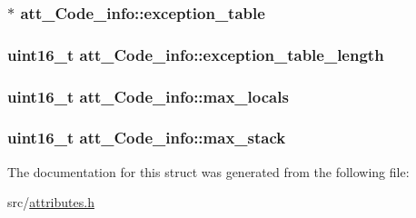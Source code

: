 \subsubsection[{\texorpdfstring{exception\+\_\+table}{exception_table}}]{$\ast$ att\+\_\+\+Code\+\_\+info\+::exception\+\_\+table}\hypertarget{structatt__Code__info_af5c5d84bb1f725dc949981cc752c45d2}{}\label{structatt__Code__info_af5c5d84bb1f725dc949981cc752c45d2}
\subsubsection[{\texorpdfstring{exception\+\_\+table\+\_\+length}{exception_table_length}}]{\setlength{\rightskip}{0pt plus 5cm}uint16\+\_\+t att\+\_\+\+Code\+\_\+info\+::exception\+\_\+table\+\_\+length}\hypertarget{structatt__Code__info_aacd07775342d4f5ace7485e36e2e5e3b}{}\label{structatt__Code__info_aacd07775342d4f5ace7485e36e2e5e3b}
\subsubsection[{\texorpdfstring{max\+\_\+locals}{max_locals}}]{\setlength{\rightskip}{0pt plus 5cm}uint16\+\_\+t att\+\_\+\+Code\+\_\+info\+::max\+\_\+locals}\hypertarget{structatt__Code__info_acc9a5f7316ef5c5e051f88646bacf445}{}\label{structatt__Code__info_acc9a5f7316ef5c5e051f88646bacf445}
\subsubsection[{\texorpdfstring{max\+\_\+stack}{max_stack}}]{\setlength{\rightskip}{0pt plus 5cm}uint16\+\_\+t att\+\_\+\+Code\+\_\+info\+::max\+\_\+stack}\hypertarget{structatt__Code__info_aa2d5de07b8832d1cd18a3e4779348fe3}{}\label{structatt__Code__info_aa2d5de07b8832d1cd18a3e4779348fe3}


The documentation for this struct was generated from the following file\+:\begin{DoxyCompactItemize}
\item 
src/\hyperlink{attributes_8h}{attributes.\+h}\end{DoxyCompactItemize}
